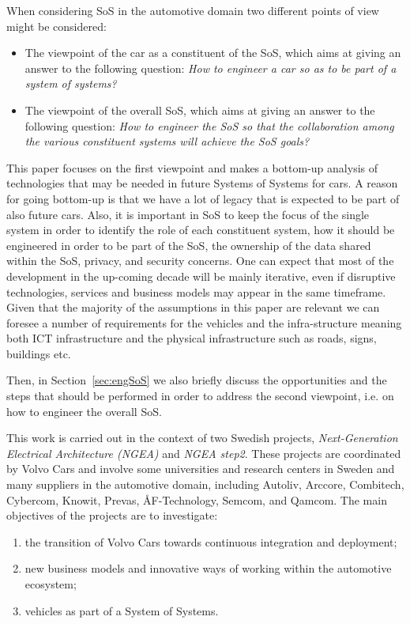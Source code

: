 When considering SoS in the automotive domain two different points of view might be considered: 

\begin{itemize}
    \item The viewpoint of the car as a constituent of the SoS, which aims at giving an answer to the following question: {\em How to engineer a car so as to be part of a system of systems?} %
    \item The viewpoint of the overall SoS, which aims at giving an answer to the following question: {\em How to engineer the SoS so that the collaboration among the various constituent systems will achieve the SoS goals?}  
\end{itemize}

This paper focuses on the first viewpoint and makes a bottom-up analysis of technologies that may be needed in future Systems of Systems for cars. A reason for going bottom-up is that we have a lot of legacy that is expected to be part of also future cars.
Also, it is important in SoS to keep the focus of the single system in order to identify the role of each constituent system, how it should be engineered in order to be part of the SoS, the ownership of the data shared within the SoS, privacy, and security concerns. 
One can expect that most of the development in the up-coming decade  will be mainly iterative, even if disruptive technologies, services and business models may appear in the same timeframe.
Given that the majority of the assumptions in this paper are relevant we can foresee a number of requirements for the vehicles and the infra-structure meaning both ICT infrastructure and the physical infrastructure such as roads, signs, buildings etc. 

Then, in Section~\ref{sec:engSoS} we also briefly discuss the opportunities and the steps that should be performed in order to address the second viewpoint, i.e. on how to engineer the overall SoS. 

This work is carried out in the context of two Swedish projects, {\em Next-Generation Electrical Architecture (NGEA)} and {\em NGEA step2}. 
These projects are coordinated by Volvo Cars and involve some universities and research centers in Sweden and many suppliers in the automotive domain, including Autoliv, Arccore, Combitech, Cybercom, Knowit, Prevas, \AA F-Technology, Semcom, and Qamcom. %
The main objectives of the projects are to investigate:
	\begin{enumerate} %
		\item the transition of Volvo Cars towards continuous integration and deployment;
		\item new business models and innovative ways of working within the automotive ecosystem; 
		\item vehicles as part of a System of Systems.
	\end{enumerate}


